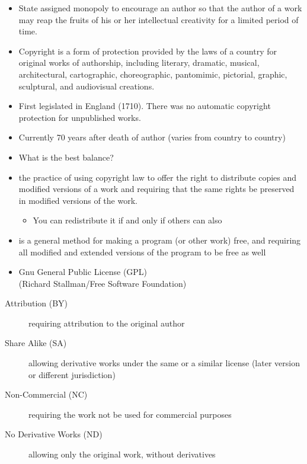\documentclass[a4paper,landscape,headrule,footrule,xetex]{foils}
\begin{document}

\begin{itemize}
\item State assigned monopoly to encourage an author so that the author of a
  work may reap the fruits of his or her intellectual creativity for a
  limited period of time.
\item Copyright is a form of protection provided by the laws of a
  country for original works of authorship, including literary,
  dramatic, musical, architectural, cartographic, choreographic,
  pantomimic, pictorial, graphic, sculptural, and audiovisual
  creations.
\item First legislated in England (1710). There was no automatic copyright protection for unpublished works.
\item Currently 70 years after death of author (varies from country to country)
\item What is the best balance?
\end{itemize}


\begin{itemize}
\item the practice of using copyright law to offer the right to distribute copies and modified versions of a work and requiring that the same rights be preserved in modified versions of the work.
  \begin{itemize}
  \item You can redistribute it if and only if others can also
  \end{itemize}
\item {} is a general method for making a program (or other work) free, and requiring all modified and extended versions of the program to be free as well
\item Gnu General Public License (GPL)
 \\ (Richard Stallman/Free Software Foundation)
\end{itemize}


\begin{description}
\item [Attribution (BY)] requiring attribution to the original author
\item [Share Alike (SA)] allowing derivative  works under the same or
  a similar license (later version or different jurisdiction)
\item [Non-Commercial (NC)] requiring the work not be used for commercial purposes
\item [No Derivative Works (ND)] allowing only the original work, without derivatives
\end{description}
\end{document}
